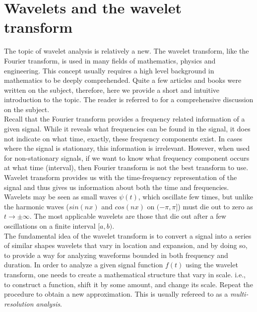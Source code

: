 \documentclass[12pt,english]{report}
\begin{document}
\chapter{Wavelets and the wavelet transform}

The topic of wavelet analysis is relatively a new. The wavelet transform, like the Fourier transform, is used in many fields of mathematics, physics and engineering. This concept usually requires a high level background in mathematics to be deeply comprehended. Quite a few articles and books were written on the subject, therefore, here we provide a short and intuitive introduction to the topic. The reader is referred to \cite{meyer1992wavelets} for a comprehensive discussion on the subject.\\ 

Recall that the Fourier transform provides a frequency related information of a given signal. While it reveals what frequencies can be found in the signal, it does not indicate on what time, exactly, these frequency components exist. In cases where the signal is stationary, this information is irrelevant. However, when used for non-stationary signals, if we want to know what frequency component occurs at what time (interval), then Fourier transform is not the best transform to use. Wavelet transform provides us with the time-frequency representation of the signal and thus gives us information about both the time and frequencies.\\

Wavelets may be seen as small waves $\psi(t)$, which oscillate few times, but unlike the harmonic waves ($sin(nx)$ and $cos(nx)$ on $(-\pi,\pi]$) must die out to zero as $t \rightarrow \pm\infty$. The most applicable wavelets are those that die out after a few oscillations on a finite interval $[a,b)$. \\

The fundamental idea of the wavelet transform is to convert a signal into a series of similar shapes wavelets that vary in location and expansion, and by doing so, to provide a way for analyzing waveforms bounded in both frequency and duration. 
In order to analyze a given signal function $f(t)$ using the wavelet transform, one needs to create a mathematical structure that vary in scale. i.e., to construct a function, shift it by some amount, and change its scale. Repeat the procedure to obtain a new approximation. This is usually refereed to as a \emph{multi-resolution analysis}.\\ 
\end{document}
